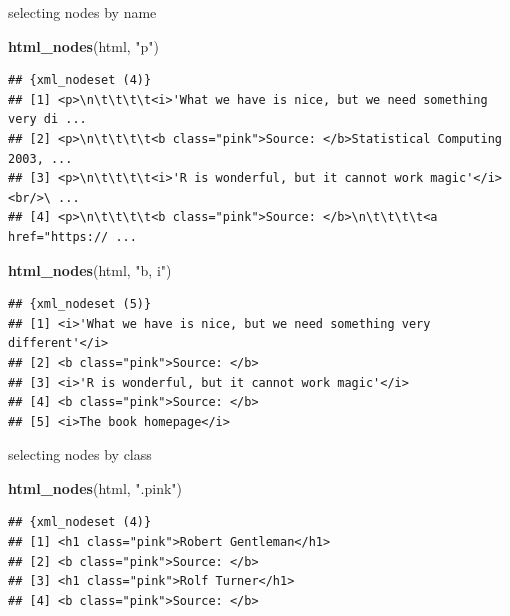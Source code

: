 \documentclass[ignorenonframetext,]{beamer}
\newenvironment{Shaded}{\begin{snugshade}}{\end{snugshade}}
\newcommand{\KeywordTok}[1]{\textcolor[rgb]{0.13,0.29,0.53}{\textbf{{#1}}}}
\newcommand{\StringTok}[1]{\textcolor[rgb]{0.31,0.60,0.02}{{#1}}}
\newcommand{\NormalTok}[1]{{#1}}
\begin{document}
\begin{frame}[fragile]{selecting nodes by name}

\begin{Shaded}
\begin{Highlighting}[]
\KeywordTok{html_nodes}\NormalTok{(html, }\StringTok{"p"}\NormalTok{)}
\end{Highlighting}
\end{Shaded}

\begin{verbatim}
## {xml_nodeset (4)}
## [1] <p>\n\t\t\t\t<i>'What we have is nice, but we need something very di ...
## [2] <p>\n\t\t\t\t<b class="pink">Source: </b>Statistical Computing 2003, ...
## [3] <p>\n\t\t\t\t<i>'R is wonderful, but it cannot work magic'</i><br/>\ ...
## [4] <p>\n\t\t\t\t<b class="pink">Source: </b>\n\t\t\t\t<a href="https:// ...
\end{verbatim}

\begin{Shaded}
\begin{Highlighting}[]
\KeywordTok{html_nodes}\NormalTok{(html, }\StringTok{"b, i"}\NormalTok{)}
\end{Highlighting}
\end{Shaded}

\begin{verbatim}
## {xml_nodeset (5)}
## [1] <i>'What we have is nice, but we need something very different'</i>
## [2] <b class="pink">Source: </b>
## [3] <i>'R is wonderful, but it cannot work magic'</i>
## [4] <b class="pink">Source: </b>
## [5] <i>The book homepage</i>
\end{verbatim}

\end{frame}

\begin{frame}[fragile]{selecting nodes by class}

\begin{Shaded}
\begin{Highlighting}[]
\KeywordTok{html_nodes}\NormalTok{(html, }\StringTok{".pink"}\NormalTok{)}
\end{Highlighting}
\end{Shaded}

\begin{verbatim}
## {xml_nodeset (4)}
## [1] <h1 class="pink">Robert Gentleman</h1>
## [2] <b class="pink">Source: </b>
## [3] <h1 class="pink">Rolf Turner</h1>
## [4] <b class="pink">Source: </b>
\end{verbatim}

\end{frame}
\end{document}
